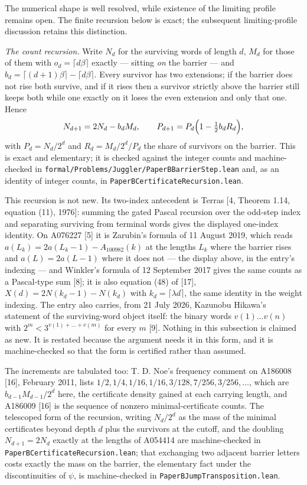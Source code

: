 \documentclass[11pt,a4paper]{article}
\begin{document}
The numerical shape is well resolved, while existence of the limiting
profile remains open. The finite recursion below is exact; the
subsequent limiting-profile discussion retains this distinction.

\emph{The count recursion.} Write \(N_d\) for the surviving words of
length \(d\), \(M_d\) for those of them with \(o_d=\lceil d\beta\rceil\)
exactly --- sitting \emph{on} the barrier --- and
\(b_d=\lceil(d+1)\beta\rceil-
\lceil d\beta\rceil\). Every survivor has two extensions; if the barrier
does not rise both survive, and if it rises then a survivor strictly
above the barrier still keeps both while one exactly on it loses the
even extension and only that one. Hence \[
N_{d+1}=2N_d-b_dM_d,\qquad P_{d+1}=P_d\Bigl(1-\tfrac12 b_dR_d\Bigr),
\] with \(P_d=N_d/2^d\) and \(R_d=M_d/2^d\big/P_d\) the share of
survivors on the barrier. This is exact and elementary; it is checked
against the integer counts and machine-checked in
\texttt{formal/Problems/Juggler/PaperBBarrierStep.lean} and, as an
identity of integer counts, in \texttt{PaperBCertificateRecursion.lean}.

This recursion is not new. Its two-index antecedent is Terras {[}4,
Theorem 1.14, equation (11), 1976{]}: summing the gated Pascal recursion
over the odd-step index and separating surviving from terminal words
gives the displayed one-index identity. On A076227 {[}5{]} it is
Zarubin's formula of 11 August 2019, which reads
\(a(L_k)=2a(L_k-1)-A_{100982}(k)\) at the lengths \(L_k\) where the
barrier rises and \(a(L)=2a(L-1)\) where it does not --- the display
above, in the entry's indexing --- and Winkler's formula of 12 September
2017 gives the same counts as a Pascal-type sum {[}8{]}; it is also
equation (48) of {[}17{]}, \(X(d)=2N(k_d-1)-N(k_d)\) with
\(k_d=\lceil\lambda d\rceil\), the same identity in the weight indexing.
The entry also carries, from 21 July 2026, Kazunobu Hikawa's statement
of the surviving-word object itself: the binary words \(v(1)\dots v(n)\)
with \(2^m<3^{v(1)+\dots+v(m)}\) for every \(m\) {[}9{]}. Nothing in
this subsection is claimed as new. It is restated because the argument
needs it in this form, and it is machine-checked so that the form is
certified rather than assumed.

The increments are tabulated too: T. D. Noe's frequency comment on
A186008 {[}16{]}, February 2011, lists
\(1/2,1/4,1/16,1/16,3/128,7/256,3/256,\dots\), which are
\(b_{d-1}M_{d-1}/2^{d}\) here, the certificate density gained at each
carrying length, and A186009 {[}16{]} is the sequence of nonzero
minimal-certificate counts. The telescoped form of the recursion,
writing \(N_d/2^d\) as the mass of the minimal certificates beyond depth
\(d\) plus the survivors at the cutoff, and the doubling
\(N_{d+1}=2N_d\) exactly at the lengths of A054414 are machine-checked
in \texttt{PaperBCertificateRecursion.lean}; that exchanging two
adjacent barrier letters costs exactly the mass on the barrier, the
elementary fact under the discontinuities of \(\psi\), is
machine-checked in \texttt{PaperBJumpTransposition.lean}.
\end{document}
